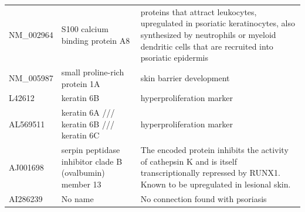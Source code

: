 \documentclass[10pt,a4paper]{article}
\begin{document}
\begin{table}[]
\begin{tabular}{l|p{4.5cm} p{8.5cm}}
		NM\_002964         & S100 calcium binding protein A8                                                                                         & proteins that attract leukocytes, upregulated in psoriatic keratinocytes, also synthesized by neutrophils or myeloid dendritic cells that are recruited into psoriatic epidermis\cite{roberson2010psoriasis}                                                          \\
		NM\_005987         & small proline-rich protein 1A                                                                                           & skin barrier development\cite{bergboer2012genetics}                                                                                                                                                                                                                    \\
		L42612             & keratin 6B                                                                                                              & hyperproliferation marker\cite{jiang2015biomarkers}                                                                                                                                                                                                                  \\
		AL569511           & keratin 6A /// keratin 6B /// keratin 6C                                                                                & hyperproliferation marker\cite{jiang2015biomarkers}                                                                                                                                                                                                                  \\
		AJ001698           & serpin peptidase inhibitor  clade B (ovalbumin) member 13                                                               & The encoded protein inhibits the activity of cathepsin K and is itself transcriptionally repressed by RUNX1. Known to be upregulated in lesional skin.\cite{suarez2012expanding}                                                                                    \\
		AI286239           &  No name                                                                                                                       &   No connection found with psoriasis                                                                                                                                                                                                                                        \\

\end{tabular}
\end{table}
\end{document}
